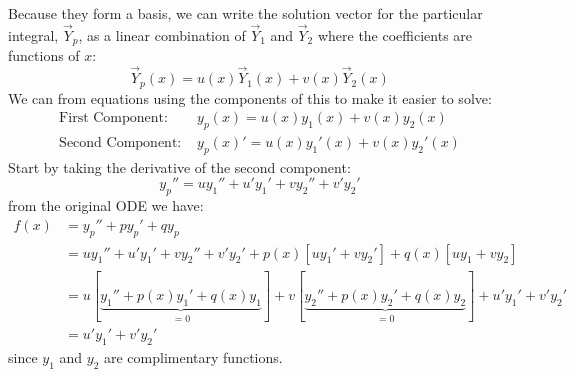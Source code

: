 \documentclass[../main.tex]{subfiles}
\begin{document}
Because they form a basis, we can write the solution vector for the particular integral, $\vec{Y}_p$, as a linear combination of $\vec{Y}_1$ and $\vec{Y}_2$ where the coefficients are functions of $x$:
\[
  \vec{Y}_p(x) = u(x)\vec{Y}_1(x) + v(x)\vec{Y}_2(x)
\]
We can from equations using the components of this to make it easier to solve:
\begin{align*}
  \text{First Component: }&y_p(x) = u(x)y_1(x) + v(x)y_2(x) \\
  \text{Second Component: }&y_p(x)' = u(x)y_1'(x) + v(x)y_2'(x)
\end{align*}
Start by taking the derivative of the second component:
\[
  y_p'' = u y_1'' + u'y_1' + vy_2'' + v'y_2'
\]
from the original ODE we have:
\begin{align*}
  f(x) &= y_p'' + py_p' + qy_p \\
       &= uy_1'' + u' y_1' + vy_2'' + v'y_2' + p(x)[uy_1' + vy_2'] + q(x)[uy_1 + vy_2] \\
       &= u[\underbrace{y_1'' + p(x)y_1' + q(x)y_1}_{=0}] + v[\underbrace{y_2'' + p(x)y_2' + q(x)y_2}_{=0}] + u'y_1' + v'y_2' \\
       &= u'y_1' + v'y_2'
\end{align*}
since $y_1$ and $y_2$ are complimentary functions.
\end{document}

